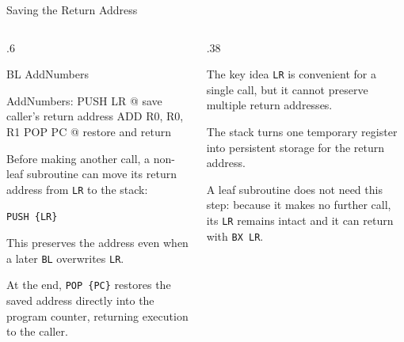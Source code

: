 \documentclass[9pt,aspectratio=169,xcolor=table]{beamer}
\begin{document}
\begin{frame}[fragile]{Saving the Return Address}
	\begin{columns}[T]
		\begin{column}{.6\textwidth}
			\begin{asm}[basicstyle=\small\ttfamily]
    BL    AddNumbers

AddNumbers:
    PUSH  {LR}    @ save caller's return address
    ADD   R0, R0, R1
    POP   {PC}    @ restore and return
\end{asm}

			\vspace{3mm}
			{\small
				Before making another call, a non-leaf subroutine
				can move its return address from \texttt{LR} to the
				stack:

				\begin{center}
					\texttt{PUSH \{LR\}}
				\end{center}

				This preserves the address even when a later
				\texttt{BL} overwrites \texttt{LR}.

				\vspace{1mm}
				At the end, \texttt{POP \{PC\}} restores the saved
				address directly into the program counter, returning
				execution to the caller.
			}
		\end{column}

		\begin{column}{.38\textwidth}
			\begin{block}{The key idea}
				\texttt{LR} is convenient for a single call, but it
				cannot preserve multiple return addresses.

				\vspace{2mm}
				\alert{The stack turns one temporary register into
					persistent storage for the return address.}
			\end{block}

			\vspace{2mm}
			{\small
				A leaf subroutine does not need this step: because it
				makes no further call, its \texttt{LR} remains intact
				and it can return with \texttt{BX LR}.
			}
		\end{column}
	\end{columns}
\end{frame}
\end{document}
